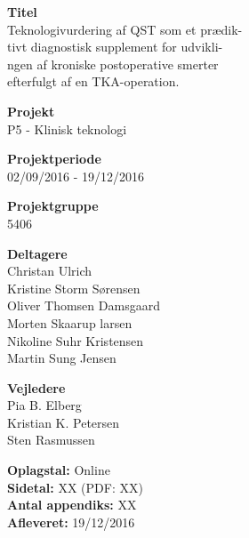 \begin{minipage}[t]{0.48\textwidth}
\textbf{Titel} \\[5pt]\hspace*{2ex} 
Teknologivurdering af QST som et prædik-\\\hspace*{2ex}
tivt diagnostisk supplement for udvikli-\\\hspace*{2ex} 
ngen af kroniske postoperative smerter \\\hspace*{2ex} 
efterfulgt af en TKA-operation. \\\hspace*{2ex} 



\textbf{Projekt} \\[5pt]\hspace*{2ex} 
P5 - Klinisk teknologi\\\hspace*{2ex}


\textbf{Projektperiode} \\[5pt]\bigskip\hspace{2ex}
02/09/2016 - 19/12/2016

\textbf{Projektgruppe} \\[5pt]\bigskip\hspace{2ex}
5406

\textbf{Deltagere} \\[5pt]\hspace*{2ex}
Christan Ulrich \\\hspace*{2ex}
Kristine Storm Sørensen \\\hspace*{2ex}
Oliver Thomsen Damsgaard \\\hspace*{2ex}
Morten Skaarup larsen\\\hspace*{2ex}
Nikoline Suhr Kristensen \\\hspace*{2ex}
Martin Sung Jensen \\\bigskip\hspace{2ex}


\textbf{Vejledere} \\[5pt]\hspace*{2ex}
Pia B. Elberg \\\hspace*{2ex}
Kristian K. Petersen\\\hspace*{2ex}
Sten Rasmussen\\\smallskip\hspace*{2ex}

\textbf{Oplagstal:} Online \\
\textbf{Sidetal:} XX (PDF: XX) \\
\textbf{Antal appendiks:} XX \\ 
\textbf{Afleveret:} 19/12/2016

\end{minipage}
